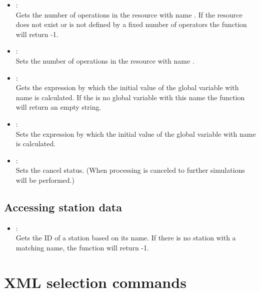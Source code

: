 \begin{itemize}
\item
{}:\\
Gets the number of operations in the resource with name .
If the resource does not exist or is not defined by a fixed number of operators
the function will return -1.

\item
{}:\\
Sets the number of operations in the resource with name .

\item
{}:\\
Gets the expression by which the initial value of the global variable with
name  is calculated. If the is no global variable with
this name the function will return an empty string.

\item
{}:\\
Sets the expression by which the initial value of the global variable with
name  is calculated.

\item
{}:\\
Sets the cancel status. (When processing is canceled to further simulations will be performed.)

\end{itemize}

\section{Accessing station data}

\begin{itemize}

\item
{}:\\
Gets the ID of a station based on its name.
If there is no station with a matching name, the function will return -1.

\end{itemize}



\chapter{XML selection commands}

